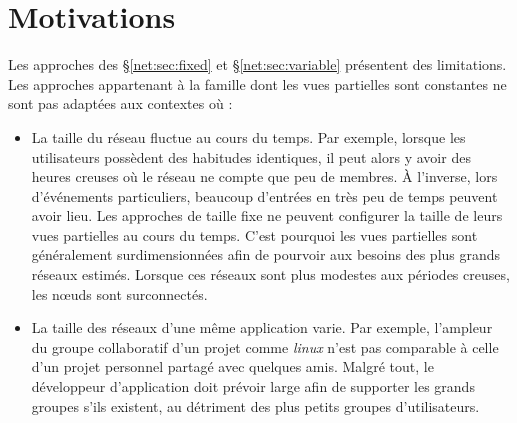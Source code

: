 
\section{Motivations}
\label{net:sec:motivations}

Les approches des §\ref{net:sec:fixed} et §\ref{net:sec:variable} présentent des
limitations. Les approches appartenant à la famille dont les vues partielles
sont constantes ne sont pas adaptées aux contextes où :
\begin{itemize}
\item La taille du réseau fluctue au cours du temps. Par exemple, lorsque les
  utilisateurs possèdent des habitudes identiques, il peut alors y avoir des
  heures creuses où le réseau ne compte que peu de membres. À l'inverse, lors
  d'événements particuliers, beaucoup d'entrées en très peu de temps peuvent
  avoir lieu.  Les approches de taille fixe ne peuvent configurer la taille de
  leurs vues partielles au cours du temps. C'est pourquoi les vues partielles
  sont généralement surdimensionnées afin de pourvoir aux besoins des plus
  grands réseaux estimés. Lorsque ces réseaux sont plus modestes aux périodes
  creuses, les nœuds sont surconnectés.
\item La taille des réseaux d'une même application varie. Par exemple, l'ampleur
  du groupe collaboratif d'un projet comme \emph{linux} n'est pas comparable à
  celle d'un projet personnel partagé avec quelques amis. Malgré tout, le
  développeur d'application doit prévoir large afin de supporter les grands
  groupes s'ils existent, au détriment des plus petits groupes d'utilisateurs.
\end{itemize}

